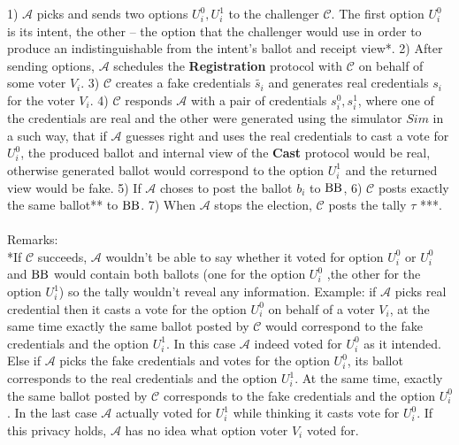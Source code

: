  1)  $\mathcal{A}$ picks and sends two options $U_i^0,U_i^1$ to the challenger $\mathcal{C}$. The first option $U_i^0$ is its intent, the other -- the option that the challenger would use in order to produce an indistinguishable from the intent's ballot and receipt view*. 2) After sending options, $\mathcal{A}$ schedules the   \textbf{Registration} protocol with $\mathcal{C}$ on behalf of some voter $V_i$. 3) $\mathcal{C}$ creates a fake credentials $\tilde{s_i}$ and generates real credentials $s_i$ for the voter $V_i$. 4) $\mathcal{C}$ responds $\mathcal{A}$ with a pair of credentials $s_i^0,s_i^1$, where one of the credentials are real and the other were generated using the simulator $Sim$ in a such way, that if $\mathcal{A}$ guesses right and uses the real credentials to cast a vote for $U_i^0$, the produced ballot and internal view of the \textbf{Cast} protocol would be real, otherwise generated ballot would correspond to the option $U_i^1$ and the returned view would be fake. 5) If $\mathcal{A}$ choses to post the ballot $b_i$ to $\operatorname{BB}$, 6) $\mathcal{C}$  posts exactly the same ballot** to $\operatorname{BB}$. 7) When $\mathcal{A}$ stops the election, $\mathcal{C}$ posts the tally $\tau$ ***. \\\\
Remarks:\\
*If  $\mathcal{C}$ succeeds, $\mathcal{A}$ wouldn't be able to say whether it voted for option $U_i^0$ or $U_i^0$ and $\operatorname{BB}$ would contain both ballots (one for the option $U_i^0$ ,the other for the option $U_i^1$) so the tally wouldn't reveal any information. Example: if $\mathcal{A}$  picks real credential then it casts a vote for the option  $U_i^0$ on behalf of a voter $V_i$, at the same time exactly the same ballot posted by $\mathcal{C}$ would correspond to the fake credentials and the option $U_i^1$. In this case $\mathcal{A}$ indeed voted for $U_i^0$ as it intended. Else if $\mathcal{A}$ picks the fake credentials and votes for the option $U_i^0$,  its ballot corresponds to the real credentials and  the option $U_i^1$. At the same time, exactly the same ballot posted by $\mathcal{C}$ corresponds to the fake credentials  and the option $U_i^0$. In the last case $\mathcal{A}$ actually voted for $U_i^1$ while thinking it casts vote for $U_i^0$. If this privacy holds,  $\mathcal{A}$ has no idea what option voter $V_i$ voted for. \\\\
